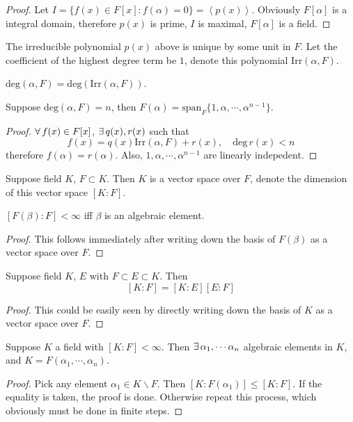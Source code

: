 \begin{proof}
    Let $I=\{f(x)\in F[x]:f(\alpha)=0\}=\left<p(x)\right>$. Obviously $F[\alpha]$ is a integral domain, therefore $p(x)$ is prime, $I$ is maximal, $F[\alpha]$ is a field.
\end{proof}
\begin{remark}
    The irreducible polynomial $p(x)$ above is unique by some unit in $F$. Let the coefficient of the highest degree term be $1$, denote this polynomial $\mathrm{Irr}(\alpha,F)$.
\end{remark}
\begin{definition}[Degree]
    $\mathrm{deg}(\alpha,F)=\mathrm{deg}(\mathrm{Irr}(\alpha,F))$.
\end{definition}
\begin{proposition}
    Suppose $\mathrm{deg}(\alpha,F)=n$, then $F(\alpha)=\mathrm{span}_F\{1,\alpha,\cdots,\alpha^{n-1}\}$.
\end{proposition}
\begin{proof}
    $\forall\, f(x)\in F[x]$, $\exists\, q(x), r(x)$ such that
    $$
    f(x)=q(x)\mathrm{Irr}(\alpha, F)+r(x),\quad \mathrm{deg}\,r(x)<n
    $$
    therefore $f(\alpha)=r(\alpha)$. Also, $1,\alpha,\cdots,\alpha^{n-1}$ are linearly indepedent.
\end{proof}
\begin{definition}
    Suppose field $K$, $F\subset K$. Then $K$ is a vector space over $F$, denote the dimension of this vector space $[K:F]$.
\end{definition}
\begin{proposition}
    $[F(\beta):F]<\infty$ iff $\beta$ is an algebraic element.
\end{proposition}
\begin{proof}
    This follows immediately after writing down the basis of $F(\beta)$ as a vector space over $F$.
\end{proof}
\begin{proposition}
    Suppose field $K$, $E$ with $F\subset E\subset K$. Then
    $$
    [K:F]=[K:E][E:F]
    $$
\end{proposition}
\begin{proof}
    This could be easily seen by directly writing down the basis of $K$ as a vector space over $F$.
\end{proof}
\begin{proposition}
    Suppose $K$ a field with $[K:F]<\infty$. Then $\exists\, \alpha_1,\cdots\alpha_n$ algebraic elements in $K$, and $K=F(\alpha_1,\cdots,\alpha_n)$.
\end{proposition}
\begin{proof}
    Pick any element $\alpha_1\in K\backslash F$. Then $[K:F(\alpha_1)]\le[K:F]$. If the equality is taken, the proof is done. Otherwise repeat this process, which obviously must be done in finite steps.
\end{proof}